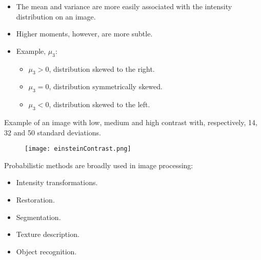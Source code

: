 
\begin{frame}
\begin{itemize}
\item The mean and variance are more easily associated with the intensity distribution on an image.
\item Higher moments, however, are more subtle.
\item Example, $\mu_{3}$:
\begin{itemize}
\item $\mu_{3} > 0$, distribution skewed to the right.
\item $\mu_{3} = 0$, distribution symmetrically skewed.
\item $\mu_{3} < 0$, distribution skewed to the left.
\end{itemize}
\end{itemize}
\end{frame}


\begin{frame}
Example of an image with low, medium and high contrast with, respectively, 14, 32 and 50 standard deviations.
\begin{figure}
\centering
\texttt{[image: einsteinContrast.png]}
\end{figure}
\end{frame}


\begin{frame}
Probabilistic methods are broadly used in image processing:
\begin{itemize}
\item Intensity transformations.
\item Restoration.
\item Segmentation.
\item Texture description.
\item Object recognition.
\end{itemize}
\end{frame}





